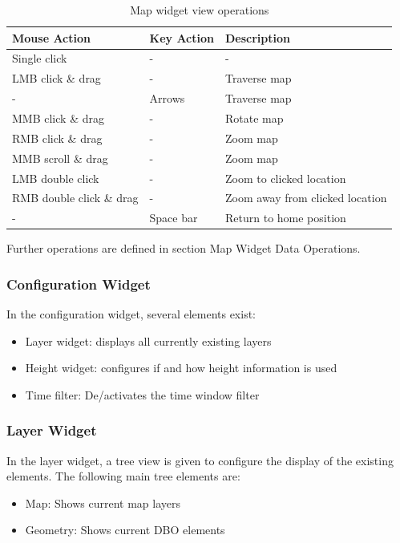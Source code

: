 \begin{table}[H]
  \center
  \begin{tabular}{ | l | l | l |}
    \hline
    \textbf{Mouse Action} & \textbf{Key Action} &  \textbf{Description} \\ \hline
    Single click & - & - \\ \hline
    LMB click \& drag & - & Traverse map \\ \hline
    - & Arrows & Traverse map \\ \hline
    MMB click \& drag & - & Rotate map \\ \hline
    RMB click \& drag & - & Zoom map \\ \hline
    MMB scroll \& drag & - & Zoom map \\ \hline
    LMB double click & - & Zoom to clicked location \\ \hline
    RMB double click \& drag & - & Zoom away from clicked location \\ \hline
    - & Space bar & Return to home position \\ \hline
  \end{tabular}
  \caption{Map widget view operations}
\end{table}

Further operations are defined in section Map Widget Data Operations.

\subsubsection{Configuration Widget}
\label{sec:osgview_config}

In the configuration widget, several elements exist:

\begin{itemize}
 \item Layer widget: displays all currently existing layers
 \item Height widget: configures if and how height information is used
 \item Time filter: De/activates the time window filter
\end{itemize}

\subsubsection{Layer Widget}

In the layer widget, a tree view is given to configure the display of the existing elements. The following main tree elements are:
\begin{itemize}
 \item Map: Shows current map layers
 \item Geometry: Shows current DBO elements
\end{itemize}


